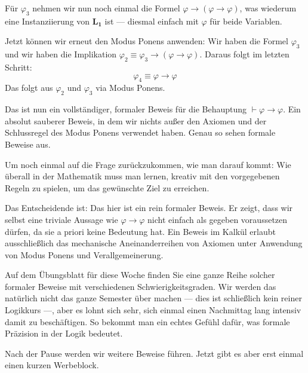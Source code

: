 \begin{spoken-clean}[00:38:34 - 00:41:29]
Für $\varphi_3$ nehmen wir nun noch einmal die Formel $\varphi \rightarrow (\varphi \rightarrow \varphi)$, was wiederum eine Instanziierung von $\mathbf{L_1}$ ist --- diesmal einfach mit $\varphi$ für beide Variablen. 

Jetzt können wir erneut den Modus Ponens anwenden: Wir haben die Formel $\varphi_3$ und wir haben die Implikation $\varphi_2 \equiv \varphi_3 \rightarrow (\varphi \rightarrow \varphi)$. Daraus folgt im letzten Schritt:
\[ \varphi_4 \equiv \varphi \rightarrow \varphi \]
Das folgt aus $\varphi_2$ und $\varphi_3$ via Modus Ponens. 

Das ist nun ein vollständiger, formaler Beweis für die Behauptung $\vdash \varphi \rightarrow \varphi$. Ein absolut sauberer Beweis, in dem wir nichts außer den Axiomen und der Schlussregel des Modus Ponens verwendet haben. Genau so sehen formale Beweise aus. 

Um noch einmal auf die Frage zurückzukommen, wie man darauf kommt: Wie überall in der Mathematik muss man lernen, kreativ mit den vorgegebenen Regeln zu spielen, um das gewünschte Ziel zu erreichen. 

Das Entscheidende ist: Das hier ist ein rein formaler Beweis. Er zeigt, dass wir selbst eine triviale Aussage wie $\varphi \rightarrow \varphi$ nicht einfach als gegeben voraussetzen dürfen, da sie a priori keine Bedeutung hat. Ein Beweis im Kalkül erlaubt ausschließlich das mechanische Aneinanderreihen von Axiomen unter Anwendung von Modus Ponens und Verallgemeinerung. 

Auf dem Übungsblatt für diese Woche finden Sie eine ganze Reihe solcher formaler Beweise mit verschiedenen Schwierigkeitsgraden. Wir werden das natürlich nicht das ganze Semester über machen --- dies ist schließlich kein reiner Logikkurs ---, aber es lohnt sich sehr, sich einmal einen Nachmittag lang intensiv damit zu beschäftigen. So bekommt man ein echtes Gefühl dafür, was formale Präzision in der Logik bedeutet. 

Nach der Pause werden wir weitere Beweise führen. Jetzt gibt es aber erst einmal einen kurzen Werbeblock.
\end{spoken-clean}

